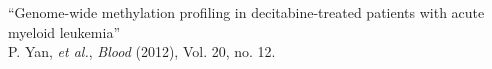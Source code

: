 ``Genome-wide methylation profiling in decitabine-treated patients with acute myeloid leukemia'' \\
\small{P. Yan, \textit{et al.}, \textit{Blood} (2012), Vol. 20, no. 12.} \\

